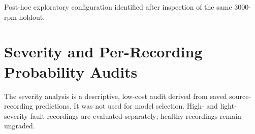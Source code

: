 \documentclass[11pt]{article}
\begin{document}
\begin{table}[H]
\centering
\caption{Recording-level mean-probability aggregation for all fusion-input definitions on the 3000-rpm holdout. Means and standard deviations are calculated across optimization seeds after probabilities have first been aggregated within each recording.}
\label{tab:s_source_fusion}
\small
{}
\vspace{0.3em}\parbox{\textwidth}{\footnotesize * Post-hoc exploratory configuration identified after inspection of the same 3000-rpm holdout.}
\end{table}


\section{Severity and Per-Recording Probability Audits}
The severity analysis is a descriptive, low-cost audit derived from saved source-recording predictions. It was not used for model selection. High- and light-severity fault recordings are evaluated separately; healthy recordings remain ungraded.
\end{document}
